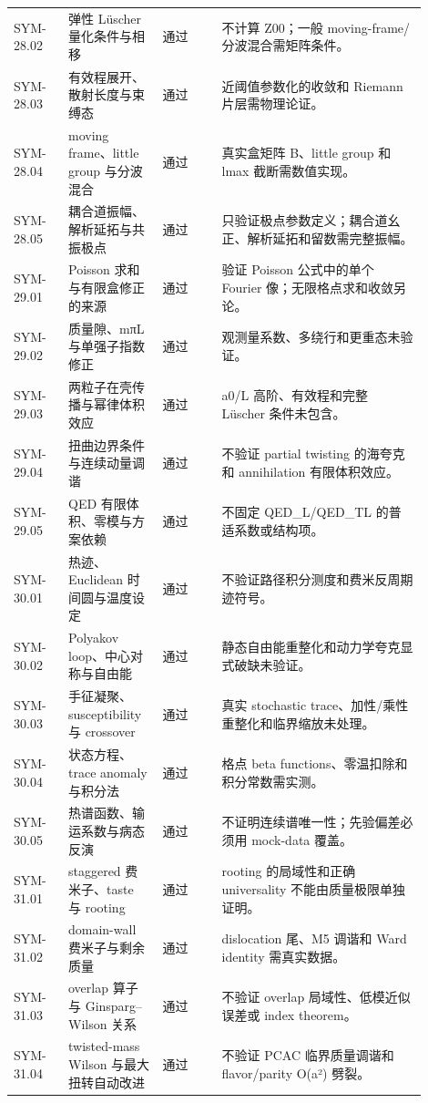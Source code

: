 \begin{longtable}{p{0.12\linewidth}p{0.20\linewidth}p{0.13\linewidth}p{0.45\linewidth}}
SYM-28.02 & 弹性 Lüscher 量化条件与相移 & 通过 & 不计算 Z00；一般 moving-frame/分波混合需矩阵条件。\\
SYM-28.03 & 有效程展开、散射长度与束缚态 & 通过 & 近阈值参数化的收敛和 Riemann 片层需物理论证。\\
SYM-28.04 & moving frame、little group 与分波混合 & 通过 & 真实盒矩阵 B、little group 和 lmax 截断需数值实现。\\
SYM-28.05 & 耦合道振幅、解析延拓与共振极点 & 通过 & 只验证极点参数定义；耦合道幺正、解析延拓和留数需完整振幅。\\
SYM-29.01 & Poisson 求和与有限盒修正的来源 & 通过 & 验证 Poisson 公式中的单个 Fourier 像；无限格点求和收敛另论。\\
SYM-29.02 & 质量隙、mπL 与单强子指数修正 & 通过 & 观测量系数、多绕行和更重态未验证。\\
SYM-29.03 & 两粒子在壳传播与幂律体积效应 & 通过 & a0/L 高阶、有效程和完整 Lüscher 条件未包含。\\
SYM-29.04 & 扭曲边界条件与连续动量调谐 & 通过 & 不验证 partial twisting 的海夸克和 annihilation 有限体积效应。\\
SYM-29.05 & QED 有限体积、零模与方案依赖 & 通过 & 不固定 QED\_L/QED\_TL 的普适系数或结构项。\\
SYM-30.01 & 热迹、Euclidean 时间圆与温度设定 & 通过 & 不验证路径积分测度和费米反周期迹符号。\\
SYM-30.02 & Polyakov loop、中心对称与自由能 & 通过 & 静态自由能重整化和动力学夸克显式破缺未验证。\\
SYM-30.03 & 手征凝聚、susceptibility 与 crossover & 通过 & 真实 stochastic trace、加性/乘性重整化和临界缩放未处理。\\
SYM-30.04 & 状态方程、trace anomaly 与积分法 & 通过 & 格点 beta functions、零温扣除和积分常数需实测。\\
SYM-30.05 & 热谱函数、输运系数与病态反演 & 通过 & 不证明连续谱唯一性；先验偏差必须用 mock-data 覆盖。\\
SYM-31.01 & staggered 费米子、taste 与 rooting & 通过 & rooting 的局域性和正确 universality 不能由质量极限单独证明。\\
SYM-31.02 & domain-wall 费米子与剩余质量 & 通过 & dislocation 尾、M5 调谐和 Ward identity 需真实数据。\\
SYM-31.03 & overlap 算子与 Ginsparg--Wilson 关系 & 通过 & 不验证 overlap 局域性、低模近似误差或 index theorem。\\
SYM-31.04 & twisted-mass Wilson 与最大扭转自动改进 & 通过 & 不验证 PCAC 临界质量调谐和 flavor/parity O(a²) 劈裂。\\

\end{longtable}
